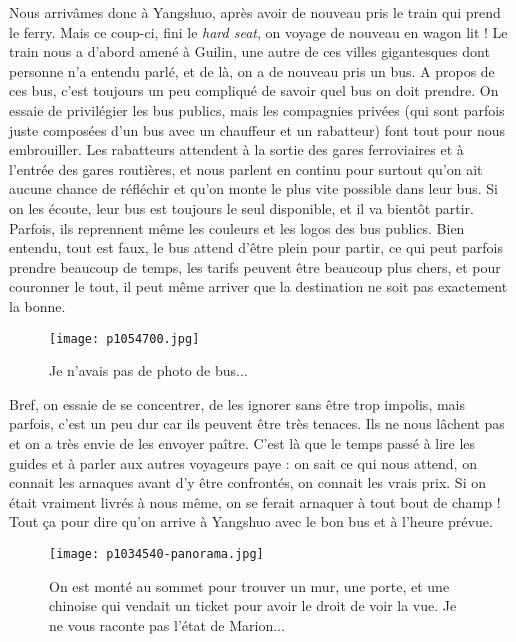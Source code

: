 \documentclass{book}
\begin{document}
Nous arrivâmes donc à Yangshuo, après avoir de nouveau pris le train qui prend le ferry. Mais ce coup-ci, fini le \emph{hard seat}, on voyage de nouveau en wagon lit ! Le train nous a d'abord amené à Guilin, une autre de ces villes gigantesques dont personne n'a entendu parlé, et de là, on a de nouveau pris un bus. A propos de ces bus, c'est toujours un peu compliqué de savoir quel bus on doit prendre. On essaie de privilégier les bus publics, mais les compagnies privées (qui sont parfois juste composées d'un bus avec un chauffeur et un rabatteur) font tout pour nous embrouiller. Les rabatteurs attendent à la sortie des gares ferroviaires et à l'entrée des gares routières, et nous parlent en continu pour surtout qu'on ait aucune chance de réfléchir et qu'on monte le plus vite possible dans leur bus. Si on les écoute, leur bus est toujours le seul disponible, et il va bientôt partir. Parfois, ils reprennent même les couleurs et les logos des bus publics. Bien entendu, tout est faux, le bus attend d'être plein pour partir, ce qui peut parfois prendre beaucoup de temps, les tarifs peuvent être beaucoup plus chers, et pour couronner le tout, il peut même arriver que la destination ne soit pas exactement la bonne.


\begin{figure}[h]
\centering
\texttt{[image: p1054700.jpg]}
\caption*{Je n'avais pas de photo de bus...}
\end{figure}

Bref, on essaie de se concentrer, de les ignorer sans être trop impolis, mais parfois, c'est un peu dur car ils peuvent être très tenaces. Ils ne nous lâchent pas et on a très envie de les envoyer paître. C'est là que le temps passé à lire les guides et à parler aux autres voyageurs paye : on sait ce qui nous attend, on connait les arnaques avant d'y être confrontés, on connait les vrais prix. Si on était vraiment livrés à nous même, on se ferait arnaquer à tout bout de champ ! Tout ça pour dire qu'on arrive à Yangshuo avec le bon bus et à l'heure prévue.


\begin{figure}[h]
\centering
\texttt{[image: p1034540-panorama.jpg]}
\caption*{On est monté au sommet pour trouver un mur, une porte, et une chinoise qui vendait un ticket pour avoir le droit de voir la vue. Je ne vous raconte pas l'état de Marion...}
\end{figure}
\end{document}
